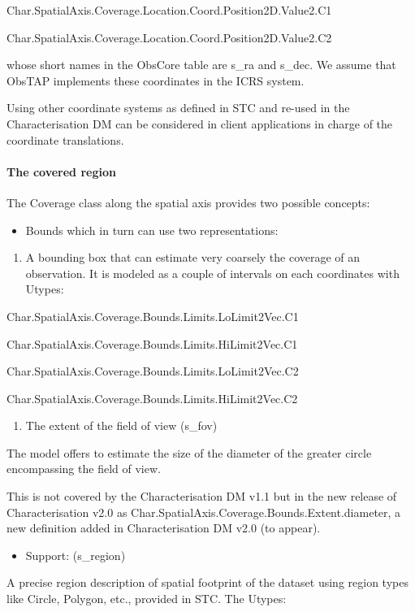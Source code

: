 \documentclass[11pt,a4paper]{ivoa}
\begin{document}
Char.SpatialAxis.Coverage.Location.Coord.Position2D.Value2.C1

Char.SpatialAxis.Coverage.Location.Coord.Position2D.Value2.C2

whose short names in the ObsCore table are s\_ra and s\_dec. We assume that ObsTAP implements these coordinates in the
ICRS system. 

Using other coordinate systems as defined in STC \cite{2009ivoa.rept.1030R} and re-used in the Characterisation DM can be
considered in client applications in charge of the coordinate translations.

\paragraph{The covered region}
The Coverage class along the spatial axis provides two possible concepts:

\begin{itemize}
\item Bounds which in turn can use two representations:
\end{itemize}
\begin{enumerate}
\item A bounding box that can estimate very coarsely the coverage of an observation.  It is modeled as a couple of
intervals on each coordinates with Utypes:
\end{enumerate}
Char.SpatialAxis.Coverage.Bounds.Limits.LoLimit2Vec.C1

Char.SpatialAxis.Coverage.Bounds.Limits.HiLimit2Vec.C1

Char.SpatialAxis.Coverage.Bounds.Limits.LoLimit2Vec.C2

Char.SpatialAxis.Coverage.Bounds.Limits.HiLimit2Vec.C2

\begin{enumerate}
\item The extent of the field of view (s\_fov) 
\end{enumerate}
The model offers to estimate the size of the diameter of the greater circle encompassing the field of view.

This is not covered by the Characterisation DM v1.1 but in the new release of Characterisation v2.0 as
Char.SpatialAxis.Coverage.Bounds.Extent.diameter, a new definition added in Characterisation DM v2.0 (to appear).

\begin{itemize}
\item Support: (s\_region)
\end{itemize}
A precise region description of spatial footprint of the dataset using region types like Circle, Polygon, etc., provided
in STC.  The Utypes:
\end{document}
